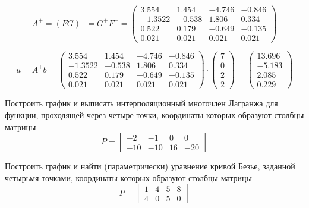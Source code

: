 \begin{equation*}
    A^+ = (FG)^+ = G^+ F^+ =
    \begin{pmatrix}
        3.554  & 1.454 & -4.746 & -0.846\\
        -1.3522 & -0.538 &  1.806 &  0.334\\
        0.522  & 0.179 & -0.649 & -0.135\\
        0.021  & 0.021 &  0.021 &  0.021
    \end{pmatrix}
\end{equation*}

\begin{equation*}
    u = A^+ b =
    \begin{pmatrix}
        3.554  & 1.454 & -4.746 & -0.846\\
        -1.3522 & -0.538 &  1.806 &  0.334\\
        0.522  & 0.179 & -0.649 & -0.135\\
        0.021  & 0.021 &  0.021 &  0.021
    \end{pmatrix}
    \cdot
    \begin{pmatrix}
        7\\
        0\\
        2\\
        2
    \end{pmatrix}
    =
    \begin{pmatrix}
        13.696\\
        -5.183\\
        2.085\\
        0.229
    \end{pmatrix}
\end{equation*}

\newpage
\begin{problem}
    Построить график и выписать интерполяционный многочлен Лагранжа для
    функции, проходящей через четыре точки, координаты которых образуют
    столбцы матрицы
    \begin{equation*}
        P =
        \begin{bmatrix}
            -2 & -1 & 0 & 0\\
            -10 & -10 & 16 & -20
        \end{bmatrix}
    \end{equation*}
\end{problem}


\begin{problem}
    Построить график и найти (параметрически) уравнение кривой Безье, заданной
    четырьмя точками, координаты которых образуют столбцы матрицы
    \begin{equation*}
        P =
        \begin{bmatrix}
            1 & 4 & 5 & 8\\
            4 & 0 & 5 & 0
        \end{bmatrix}
    \end{equation*}
\end{problem}



